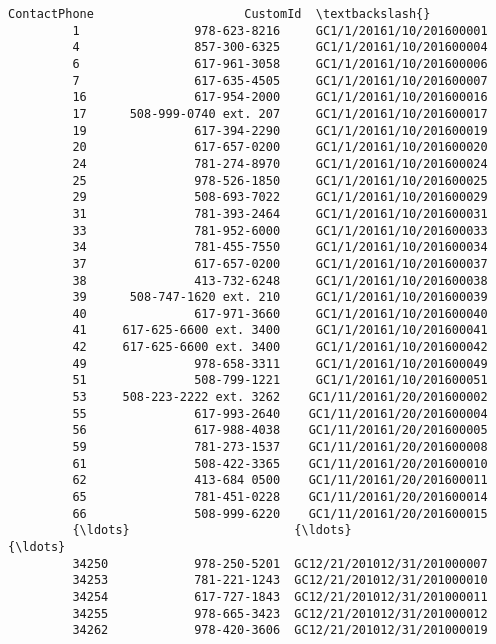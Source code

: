 \documentclass[11pt]{article}
\begin{document}
\begin{Verbatim}[commandchars=\\\{\}]
                          ContactPhone                     CustomId  \textbackslash{}
         1                978-623-8216     GC1/1/20161/10/201600001   
         4                857-300-6325     GC1/1/20161/10/201600004   
         6                617-961-3058     GC1/1/20161/10/201600006   
         7                617-635-4505     GC1/1/20161/10/201600007   
         16               617-954-2000     GC1/1/20161/10/201600016   
         17      508-999-0740 ext. 207     GC1/1/20161/10/201600017   
         19               617-394-2290     GC1/1/20161/10/201600019   
         20               617-657-0200     GC1/1/20161/10/201600020   
         24               781-274-8970     GC1/1/20161/10/201600024   
         25               978-526-1850     GC1/1/20161/10/201600025   
         29               508-693-7022     GC1/1/20161/10/201600029   
         31               781-393-2464     GC1/1/20161/10/201600031   
         33               781-952-6000     GC1/1/20161/10/201600033   
         34               781-455-7550     GC1/1/20161/10/201600034   
         37               617-657-0200     GC1/1/20161/10/201600037   
         38               413-732-6248     GC1/1/20161/10/201600038   
         39      508-747-1620 ext. 210     GC1/1/20161/10/201600039   
         40               617-971-3660     GC1/1/20161/10/201600040   
         41     617-625-6600 ext. 3400     GC1/1/20161/10/201600041   
         42     617-625-6600 ext. 3400     GC1/1/20161/10/201600042   
         49               978-658-3311     GC1/1/20161/10/201600049   
         51               508-799-1221     GC1/1/20161/10/201600051   
         53     508-223-2222 ext. 3262    GC1/11/20161/20/201600002   
         55               617-993-2640    GC1/11/20161/20/201600004   
         56               617-988-4038    GC1/11/20161/20/201600005   
         59               781-273-1537    GC1/11/20161/20/201600008   
         61               508-422-3365    GC1/11/20161/20/201600010   
         62               413-684 0500    GC1/11/20161/20/201600011   
         65               781-451-0228    GC1/11/20161/20/201600014   
         66               508-999-6220    GC1/11/20161/20/201600015   
         {\ldots}                       {\ldots}                          {\ldots}   
         34250            978-250-5201  GC12/21/201012/31/201000007   
         34253            781-221-1243  GC12/21/201012/31/201000010   
         34254            617-727-1843  GC12/21/201012/31/201000011   
         34255            978-665-3423  GC12/21/201012/31/201000012   
         34262            978-420-3606  GC12/21/201012/31/201000019   

\end{Verbatim}
\end{document}
